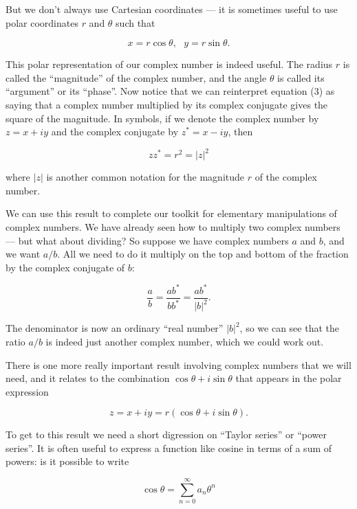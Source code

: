 
  But we don't always use Cartesian coordinates --- it is sometimes useful to 
  use polar coordinates $r$ and $\theta$ such that 

  $$x=r \cos \theta, \mathrm{~~~} y=r \sin \theta. \tag{4}$$ 

  This polar representation of our complex number is indeed useful. The radius 
  $r$ is called the ``magnitude'' of the complex number, and the angle $\theta$ 
  is called its ``argument'' or its ``phase''. Now notice that we can 
  reinterpret equation (3) as saying that a complex number multiplied by its 
  complex conjugate gives the square of the magnitude. In symbols, if we denote 
  the complex number by $z=x+iy$ and the complex conjugate by $z^*=x-iy$, then 

  $$z z^* =r^2 =|z|^2 \tag{5}$$ 

  where $|z|$ is another common notation for the magnitude $r$ of the complex 
  number. 

  We can use this result to complete our toolkit for elementary manipulations 
  of complex numbers. We have already seen how to multiply two complex numbers 
  --- but what about dividing? So suppose we have complex numbers $a$ and $b$, 
  and we want $a/b$. All we need to do it multiply on the top and bottom of the 
  fraction by the complex conjugate of $b$: 

  $$\dfrac{a}{b}=\dfrac{a b^*}{b b^*}=\dfrac{a b^*}{|b|^2}. \tag{6}$$ 

  The denominator is now an ordinary ``real number'' $|b|^2$, so we can see 
  that the ratio $a/b$ is indeed just another complex number, which we could 
  work out. 

  There is one more really important result involving complex numbers that we 
  will need, and it relates to the combination $\cos \theta + i \sin \theta$ 
  that appears in the polar expression 

  $$z=x+iy=r(\cos \theta +i \sin \theta) . \tag{7}$$ 

  To get to this result we need a short digression on ``Taylor series'' or 
  ``power series''. It is often useful to express a function like cosine in 
  terms of a sum of powers: is it possible to write 

  $$\cos \theta =\sum_{n=0}^\infty{a_n \theta^n} \tag{8}$$ 

